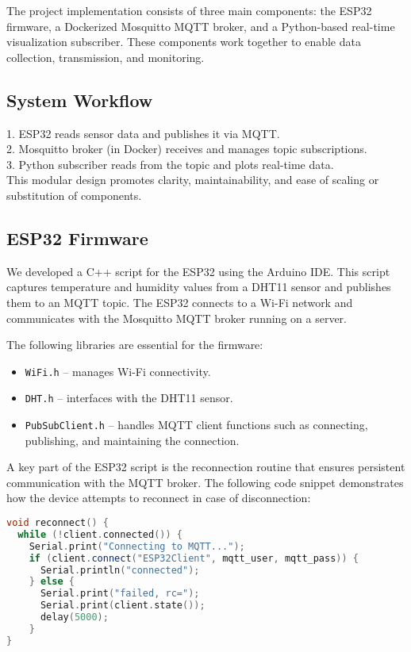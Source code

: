 \documentclass[a4paper,12pt]{article}
\begin{document}
The project implementation consists of three main components: the ESP32 firmware, a Dockerized Mosquitto MQTT broker, and a Python-based real-time visualization subscriber. These components work together to enable data collection, transmission, and monitoring.

\subsection*{System Workflow}

1. ESP32 reads sensor data and publishes it via MQTT. \\
2. Mosquitto broker (in Docker) receives and manages topic subscriptions.\\
3. Python subscriber reads from the topic and plots real-time data.\\

\noindent This modular design promotes clarity, maintainability, and ease of scaling or substitution of components.

\subsection*{ESP32 Firmware}

We developed a C++ script for the ESP32 using the Arduino IDE. This script captures temperature and humidity values from a DHT11 sensor and publishes them to an MQTT topic. The ESP32 connects to a Wi-Fi network and communicates with the Mosquitto MQTT broker running on a server. 

\noindent The following libraries are essential for the firmware:
\begin{itemize}
    \item \texttt{WiFi.h} – manages Wi-Fi connectivity.
    \item \texttt{DHT.h} – interfaces with the DHT11 sensor.
    \item \texttt{PubSubClient.h} – handles MQTT client functions such as connecting, publishing, and maintaining the connection.
\end{itemize}

\noindent A key part of the ESP32 script is the reconnection routine that ensures persistent communication with the MQTT broker. The following code snippet demonstrates how the device attempts to reconnect in case of disconnection:
\begin{lstlisting}[language=C++,caption=MQTT Reconnection Routine]
void reconnect() {
  while (!client.connected()) {
    Serial.print("Connecting to MQTT...");
    if (client.connect("ESP32Client", mqtt_user, mqtt_pass)) {
      Serial.println("connected");
    } else {
      Serial.print("failed, rc=");
      Serial.print(client.state());
      delay(5000);
    }
}
\end{lstlisting}
\end{document}
